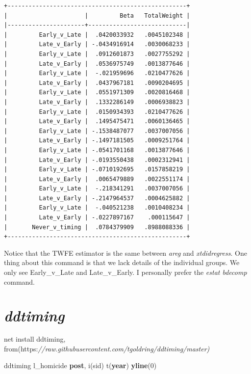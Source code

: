 \documentclass[
]{book}
\newenvironment{Shaded}{\begin{snugshade}}{\end{snugshade}}
\newcommand{\CommentTok}[1]{\textcolor[rgb]{0.56,0.35,0.01}{\textit{#1}}}
\newcommand{\FunctionTok}[1]{\textcolor[rgb]{0.13,0.29,0.53}{\textbf{#1}}}
\newcommand{\KeywordTok}[1]{\textcolor[rgb]{0.13,0.29,0.53}{\textbf{#1}}}
\newcommand{\NormalTok}[1]{#1}
\begin{document}
\begin{verbatim}
+---------------------------------------------------+
|                      |         Beta   TotalWeight |
|----------------------+----------------------------|
|         Early_v_Late |  .0420033932   .0045102348 |
|         Late_v_Early | -.0434916914   .0030068233 |
|         Early_v_Late |  .0912601873   .0027755292 |
|         Late_v_Early |  .0536975749   .0013877646 |
|         Early_v_Late |  -.021959696   .0210477626 |
|         Late_v_Early |  .0437967181   .0090204695 |
|         Early_v_Late |  .0551971309   .0020816468 |
|         Late_v_Early |  .1332286149   .0006938823 |
|         Early_v_Late |  .0150934393   .0210477626 |
|         Late_v_Early |  .1495475471   .0060136465 |
|         Early_v_Late | -.1538487077   .0037007056 |
|         Late_v_Early | -.1497181505   .0009251764 |
|         Early_v_Late | -.0541701168   .0013877646 |
|         Late_v_Early | -.0193550438   .0002312941 |
|         Early_v_Late | -.0710192695   .0157858219 |
|         Late_v_Early |  .0065479889   .0022551174 |
|         Early_v_Late |  -.218341291   .0037007056 |
|         Late_v_Early | -.2147964537   .0004625882 |
|         Early_v_Late |  -.040521238   .0010408234 |
|         Late_v_Early | -.0227897167    .000115647 |
|       Never_v_timing |  .0784379909   .8988088336 |
+---------------------------------------------------+
\end{verbatim}

Notice that the TWFE estimator is the same between \emph{areg} and \emph{xtdidregress}. One thing about this command is that we lack details of the individual groups. We only see Early\_v\_Late and Late\_v\_Early. I personally prefer the \emph{estat bdecomp} command.

\section{\texorpdfstring{\emph{ddtiming}}{ddtiming}}\label{ddtiming}

\begin{Shaded}
\begin{Highlighting}[]
\NormalTok{net install ddtiming, from(https:}\CommentTok{//raw.githubusercontent.com/tgoldring/ddtiming/master)}
\end{Highlighting}
\end{Shaded}

\begin{Shaded}
\begin{Highlighting}[]
\NormalTok{ddtiming l\_homicide }\KeywordTok{post}\NormalTok{, i(sid) t(}\FunctionTok{year}\NormalTok{) }\KeywordTok{yline}\NormalTok{(0) }
\end{Highlighting}
\end{Shaded}
\end{document}
